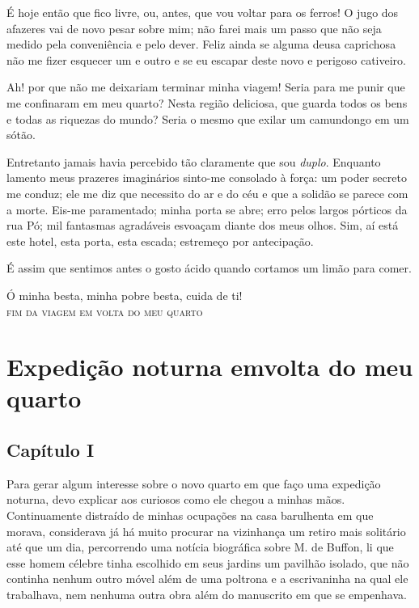  É hoje então que fico livre, ou, antes, que vou voltar para os ferros!
O jugo dos afazeres vai de novo pesar sobre mim; não farei mais um
passo que não seja medido pela conveniência e pelo dever. Feliz
ainda se alguma deusa caprichosa não me fizer esquecer um e outro e se
eu escapar deste novo e perigoso cativeiro.

 Ah! por que não me deixariam terminar minha viagem! Seria para me punir
que me confinaram em meu quarto? Nesta região deliciosa, que guarda
todos os bens e todas as riquezas do mundo? Seria o mesmo que exilar um
camundongo em um sótão.  

 Entretanto jamais havia percebido tão claramente que sou
\textit{duplo}. Enquanto lamento meus prazeres imaginários sinto-me
consolado à força: um poder secreto me conduz; ele me diz que necessito
do ar e do céu e que a solidão se parece com a morte. Eis-me
paramentado; minha porta se abre; erro pelos largos pórticos da rua Pó;
mil fantasmas agradáveis esvoaçam diante dos meus olhos. Sim, aí está
este hotel, esta porta,  esta escada; estremeço por \mbox{antecipação.}
\pagebreak

É assim que sentimos antes o gosto ácido quando cortamos um limão para
comer. 

Ó minha besta, minha pobre besta, cuida de ti!
\ \\

\hfil\textsc{fim da viagem em volta do meu quarto}

\chapter[Expedição noturna em volta do meu quarto]{Expedição noturna em\break volta do meu quarto}

\section{Capítulo I}

Para gerar algum interesse sobre o novo quarto em que faço uma expedição
noturna, devo explicar aos curiosos como ele chegou a minhas mãos.
Continuamente distraído de minhas ocupações na casa barulhenta em que
morava, considerava já há muito procurar na vizinhança um retiro mais
solitário até que um dia, percorrendo uma notícia biográfica sobre M.
de Buffon, li que esse homem célebre tinha escolhido em seus jardins um
pavilhão isolado, que não continha nenhum outro móvel além de uma
poltrona e a escrivaninha na qual ele trabalhava, nem nenhuma outra
obra além do manuscrito em que se empenhava. 

